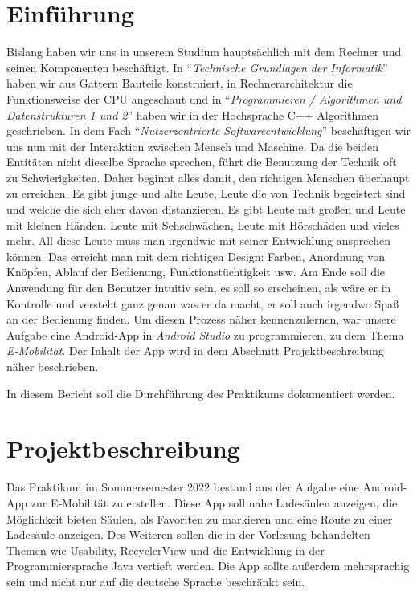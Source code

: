 \documentclass[utf8]{lni}
\begin{document}
\section{Einführung}
Bislang haben wir uns in unserem Studium hauptsächlich mit dem Rechner und seinen Komponenten beschäftigt. In "`\textit{Technische Grundlagen der Informatik}"' haben wir aus Gattern Bauteile konstruiert, in Rechnerarchitektur die Funktionsweise der CPU angeschaut und in "`\textit{Programmieren / Algorithmen und Datenstrukturen 1 und 2}"' haben wir in der Hochsprache C++ Algorithmen geschrieben.\newline
In dem Fach "`\textit{Nutzerzentrierte Softwareentwicklung}"' beschäftigen wir uns nun mit der Interaktion zwischen Mensch und Maschine. Da die beiden Entitäten nicht dieselbe Sprache sprechen, führt die Benutzung der Technik oft zu Schwierigkeiten. Daher beginnt alles damit, den richtigen Menschen überhaupt zu erreichen. Es gibt junge und alte Leute, Leute die von Technik begeistert sind und welche die sich eher davon distanzieren. Es gibt Leute mit großen und Leute mit kleinen Händen. Leute mit Sehschwächen, Leute mit Hörschäden und vieles mehr. All diese Leute muss man irgendwie mit seiner Entwicklung ansprechen können. Das erreicht man mit dem richtigen Design: Farben, Anordnung von Knöpfen, Ablauf der Bedienung, Funktionstüchtigkeit usw. Am Ende soll die Anwendung für den Benutzer intuitiv sein, es soll so erscheinen, als wäre er in Kontrolle und versteht ganz genau was er da macht, er soll auch irgendwo Spaß an der Bedienung finden.\newline
Um diesen Prozess näher kennenzulernen, war unsere Aufgabe eine Android-App in \textit{Android Studio} zu programmieren, zu dem Thema \textit{E-Mobilität}. Der Inhalt der App wird in dem Abschnitt Projektbeschreibung näher beschrieben.

In diesem Bericht soll die Durchführung des Praktikums dokumentiert werden.

\section{Projektbeschreibung}
Das Praktikum im Sommersemester 2022 bestand aus der Aufgabe eine Android-App zur E‐Mobilität zu erstellen. Diese App soll nahe Ladesäulen anzeigen, die Möglichkeit bieten Säulen, als Favoriten zu markieren und eine Route zu einer Ladesäule anzeigen. Des Weiteren sollen die in der Vorlesung behandelten Themen wie Usability, RecyclerView und die Entwicklung in der Programmiersprache Java vertieft werden. Die App sollte außerdem mehrsprachig sein und nicht nur auf die deutsche Sprache beschränkt sein.
\end{document}
